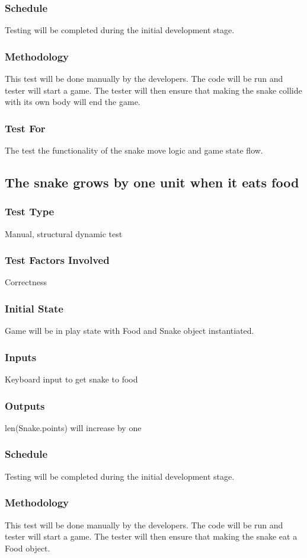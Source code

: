 \documentclass[12pt]{article}
\begin{document}
\subsubsection*{Schedule}
Testing will be completed during the initial development stage.
\subsubsection*{Methodology}
This test will be done manually by the developers. The code will be run and tester will start a game. The tester will then ensure that making the snake collide with its own body will end the game.
\subsubsection*{Test For}
The test the functionality of the snake move logic and game state flow. \newline

\noindent
\subsection{The snake grows by one unit when it eats food}
\subsubsection*{Test Type}
Manual, structural dynamic test
\subsubsection*{Test Factors Involved}
Correctness
\subsubsection*{Initial State}
Game will be in play state with Food and Snake object instantiated.
\subsubsection*{Inputs}
Keyboard input to get snake to food
\subsubsection*{Outputs}
len(Snake.points) will increase by one
\subsubsection*{Schedule}
Testing will be completed during the initial development stage.
\subsubsection*{Methodology}
This test will be done manually by the developers. The code will be run and tester will start a game. The tester will then ensure that making the snake eat a Food object.
\end{document}
